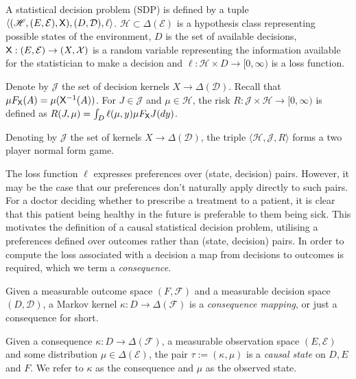 \begin{definition}
A statistical decision problem (SDP) is defined by a tuple $\langle (\mathscr{H},(E,\mathcal{E}), \mathsf{X}), (D,\mathcal{D}), \ell\rangle$. $\mathscr{H}\subset\Delta(\mathcal{E})$ is a hypothesis class representing possible states of the environment, $D$ is the set of available decisions, $\mathsf{X}:(E,\mathcal{E})\to (X,\mathcal{X})$ is a random variable representing the information available for the statistician to make a decision and $\ell:\mathcal{H}\times D\to [0,\infty)$ is a loss function.

Denote by $\mathscr{J}$ the set of decision kernels $X\to \Delta(\mathcal{D})$. Recall that $\mu F_{\mathsf{X}}(A)=\mu(\mathsf{X}^{-1}(A))$. For $J\in \mathscr{J}$ and $\mu\in \mathcal{H}$, the risk $R:\mathscr{J}\times\mathscr{H}\to [0,\infty)$ is defined as $R(J,\mu) = \int_D \ell(\mu,y) \mu F_{\mathsf{X}} J(dy)$.

Denoting by $\mathscr{J}$  the set of kernels $X\to \Delta(\mathcal{D})$, the triple $\langle \mathscr{H}, \mathscr{J}, R\rangle$ forms a two player normal form game.
\end{definition}


The loss function $\ell$ expresses preferences over (state, decision) pairs. However, it may be the case that our preferences don't naturally apply directly to such pairs. For a doctor deciding whether to prescribe a treatment to a patient, it is clear that this patient being healthy in the future is preferable to them being sick. This motivates the definition of a causal statistical decision problem, utilising a preferences defined over outcomes rather than (state, decision) pairs. In order to compute the loss associated with a decision a map from decisions to outcomes is required, which we term a \emph{consequence}.



\begin{definition}[Consequences]
Given a measurable outcome space $(F,\mathcal{F})$ and a measurable decision space $(D,\mathcal{D})$, a Markov kernel $\kappa:D \to \Delta(\mathcal{F})$ is a \emph{consequence mapping}, or just a consequence for short.
\end{definition}

\begin{definition}
Given a consequence $\kappa:D\to \Delta(\mathcal{F})$, a measurable observation space $(E,\mathcal{E})$ and some distribution $\mu\in \Delta(\mathcal{E})$, the pair $\tau:=(\kappa,\mu)$ is a \emph{causal state} on $D, E$ and $F$. We refer to $\kappa$ as the consequence and $\mu$ as the observed state.
\end{definition}

